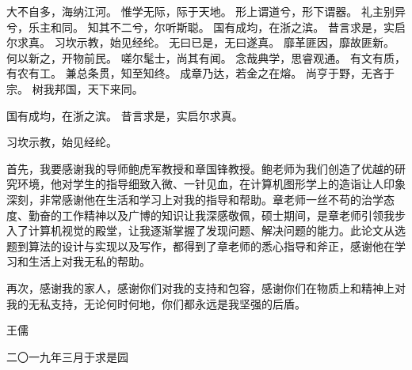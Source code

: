 \begin{thanks}

大不自多，海纳江河。
惟学无际，际于天地。
形上谓道兮，形下谓器。
礼主别异兮，乐主和同。
知其不二兮，尔听斯聪。
国有成均，在浙之滨。
昔言求是，实启尔求真。
习坎示教，始见经纶。
无曰已是，无曰遂真。
靡革匪因，靡故匪新。
何以新之，开物前民。
嗟尔髦士，尚其有闻。
念哉典学，思睿观通。
有文有质，有农有工。
兼总条贯，知至知终。
成章乃达，若金之在熔。
尚亨于野，无吝于宗。
树我邦国，天下来同。

国有成均，在浙之滨。
昔言求是，实启尔求真。

习坎示教，始见经纶。



首先，我要感谢我的导师鲍虎军教授和章国锋教授。鲍老师为我们创造了优越的研究环境，他对学生的指导细致入微、一针见血，在计算机图形学上的造诣让人印象深刻，非常感谢他在生活和学习上对我的指导和帮助。章老师一丝不苟的治学态度、勤奋的工作精神以及广博的知识让我深感敬佩，硕士期间，是章老师引领我步入了计算机视觉的殿堂，让我逐渐掌握了发现问题、解决问题的能力。此论文从选题到算法的设计与实现以及写作，都得到了章老师的悉心指导和斧正，感谢他在学习和生活上对我无私的帮助。

再次，感谢我的家人，感谢你们对我的支持和包容，感谢你们在物质上和精神上对我的无私支持，无论何时何地，你们都永远是我坚强的后盾。

\vspace*{\fill}
\begin{flushright}
    王儒

    二〇一九年三月于求是园
\end{flushright}

\end{thanks}
